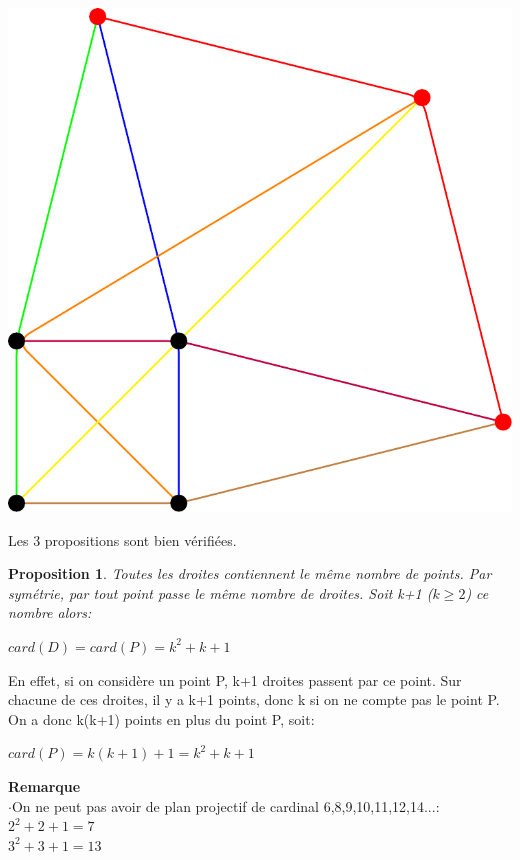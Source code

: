 \documentclass[a4paper]{article}
\newtheorem{Prop}[Def]{Proposition}
\begin{document}
\begin{center}
\includegraphics[scale=0.5]{test_tikz.pdf}
\end{center}
\vspace{2\baselineskip}
Les 3 propositions sont bien vérifiées.
\vspace{2\baselineskip}
\begin{Prop}
Toutes les droites contiennent le même nombre de points. Par symétrie, par tout point passe le même nombre de droites. Soit k+1 ($k\geq2$) ce nombre alors:
\begin{center}
$card(D)=card(P)=k^2+k+1$
\end{center}
\end{Prop}

\vspace{2\baselineskip}

En effet, si on considère un point P, k+1 droites passent par ce point. Sur chacune de ces droites, il y a k+1 points, donc k si on ne compte pas le point P. On a donc k(k+1) points en plus du point P, soit:
\begin{center}
$card(P)=k(k+1)+1=k^2+k+1$
\end{center}
\vspace{1\baselineskip}
\textbf{Remarque}\\
$\cdot$On ne peut pas avoir de plan projectif de cardinal 6,8,9,10,11,12,14...: \\
$2^2+2+1=7$ \\
  $3^2+3+1=13$\\
\end{document}
